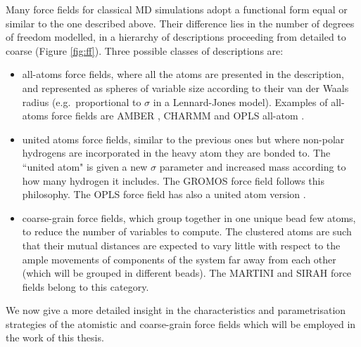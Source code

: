 Many force fields for classical MD simulations adopt a functional form equal or similar to the one described above. Their difference lies in the number of degrees of freedom modelled, in a hierarchy of descriptions proceeding from detailed to coarse (Figure \ref{fig:ff}). Three possible classes of descriptions are:
\begin{itemize}
\item all-atoms force fields, where all the atoms are presented in the description, and represented as spheres of variable size according to their van der Waals radius (e.g.\ proportional to $\sigma$ in a Lennard-Jones model). Examples of all-atoms force fields are AMBER \cite{Maier2015,Dickson2014,Wang2004_amber}, CHARMM \cite{MacKerell1998,Klauda2010,Huang2013} and OPLS all-atom \cite{Jorgensen1988}.
\item united atoms force fields, similar to the previous ones but where non-polar hydrogens are incorporated in the heavy atom they are bonded to. The ``united atom" is given a new $\sigma$ parameter and increased mass according to how many hydrogen it includes. The GROMOS force field \cite{Oostenbrink2004,Schmid2011} follows this philosophy. The OPLS force field has also a united atom version \cite{Jorgensen1996}.
\item coarse-grain force fields, which group together in one unique bead few atoms, to reduce the number of variables to compute. The clustered atoms are such that their mutual distances are expected to vary little with respect to the ample movements of components of the system far away from each other (which will be grouped in different beads). The MARTINI \cite{Marrink2007,Monticelli2008,DeJong2013} and SIRAH \cite{Machado2018,Barrera2019} force fields belong to this category.
\end{itemize}
%
We now give a more detailed insight in the characteristics and parametrisation strategies of the atomistic and coarse-grain force fields which will be employed in the work of this thesis.

